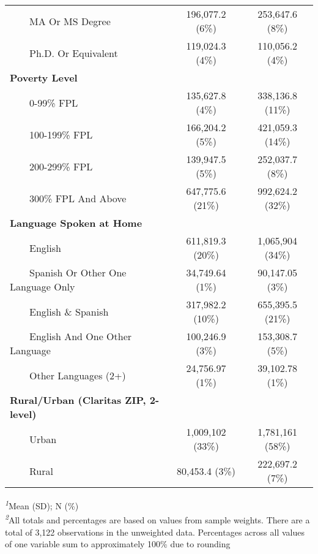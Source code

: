 \begin{table}[t]
\begin{tabular*}{\linewidth}{@{\extracolsep{\fill}}lcc}
    MA Or MS Degree & 196,077.2 (6\%)  & 253,647.6 (8\%)  \\ 
    Ph.D. Or Equivalent & 119,024.3 (4\%)  & 110,056.2 (4\%)  \\ 
{\bfseries Poverty Level} &  &  \\ 
    0-99\% FPL & 135,627.8 (4\%)  & 338,136.8 (11\%)  \\ 
    100-199\% FPL & 166,204.2 (5\%)  & 421,059.3 (14\%)  \\ 
    200-299\% FPL & 139,947.5 (5\%)  & 252,037.7 (8\%)  \\ 
    300\% FPL And Above & 647,775.6 (21\%)  & 992,624.2 (32\%)  \\ 
{\bfseries Language Spoken at Home} &  &  \\ 
    English & 611,819.3 (20\%)  & 1,065,904 (34\%)  \\ 
    Spanish Or Other One Language Only & 34,749.64 (1\%)  & 90,147.05 (3\%)  \\ 
    English \& Spanish & 317,982.2 (10\%)  & 655,395.5 (21\%)  \\ 
    English And One Other Language & 100,246.9 (3\%)  & 153,308.7 (5\%)  \\ 
    Other Languages (2+) & 24,756.97 (1\%)  & 39,102.78 (1\%)  \\ 
{\bfseries Rural/Urban (Claritas ZIP, 2-level)} &  &  \\ 
    Urban & 1,009,102 (33\%)  & 1,781,161 (58\%)  \\ 
    Rural & 80,453.4 (3\%)  & 222,697.2 (7\%)  \\ 
\bottomrule
\end{tabular*}
\begin{minipage}{\linewidth}
\textsuperscript{\textit{1}}Mean (SD); N (\%)\\
\textsuperscript{\textit{2}}All totals and percentages are based on values from sample weights. There are a total of 3,122 observations in the unweighted data. Percentages across all values of one variable sum to approximately 100\% due to rounding\\
\end{minipage}
\end{table}

